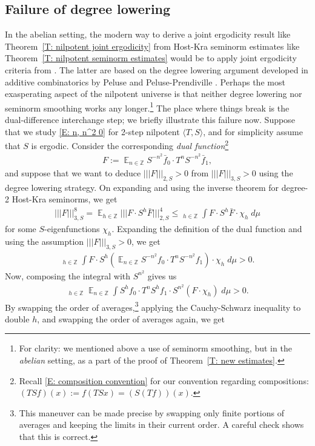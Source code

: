 \documentclass[11pt]{amsart}
\theoremstyle{definition}
\DeclareMathOperator*{\oE}{\overline{\mathbb{E}}}
\DeclareMathOperator*{\E}{\mathbb{E}}
\newcommand{\Z}{{\mathbb Z}}
\newcommand{\nnorm}[1]{\lvert\!|\!| #1|\!|\!\rvert}
\newcommand{\1}{{\mathbf{1}}}
\newcommand{\brac}[1]{\mathopen{}\left( #1 \mathclose{}\right)}
\begin{document}
\subsection{Failure of degree lowering}
In the abelian setting, the modern way to derive a joint ergodicity result like Theorem~\ref{T: nilpotent joint ergodicity} from Host-Kra seminorm estimates like Theorem~\ref{T: nilpotent seminorm estimates} would be to apply joint ergodicity criteria from \cite{BFM22, Fr21, FrKu22a}. The latter are based on the degree lowering argument developed in additive combinatorics by Peluse \cite{Pel19} and Peluse-Prendiville \cite{PP19}. Perhaps the most exasperating aspect of the nilpotent universe is that neither degree lowering nor seminorm smoothing works any longer.\footnote{For clarity: we mentioned above a use of seminorm smoothing, but in the \textit{abelian} setting, as a part of the proof of Theorem~\ref{T: new estimates}.} The place where things break is the dual-difference interchange step; we briefly illustrate this failure now. Suppose that we study \eqref{E: n, n^2 0} for 2-step nilpotent $\langle T, S\rangle$, and for simplicity assume that $S$ is ergodic. Consider the corresponding \textit{dual function}\footnote{Recall \eqref{E: composition convention} for our convention regarding compositions: $(TSf)(x) := f(TSx) = (S(Tf))(x).$}
\begin{align*}
    F := \E_{n\in\Z} S^{-n^2}\bar f_0\cdot T^n S^{-n^2}\bar f_1,
\end{align*}
and suppose that we want to deduce $\nnorm{F}_{2,S}>0$ from $\nnorm{F}_{3, S}>0$ using the degree lowering strategy. On expanding and using the inverse theorem for degree-2 Host-Kra seminorms, we get
\begin{align*}
    \nnorm{F}_{3,S}^8 = \E_{h\in\Z}\nnorm{F\cdot S^h\bar F}_{2,S}^4\leq \oE_{h\in\Z}\int F\cdot S^h\bar F\cdot \chi_h\; d\mu
\end{align*}
for some $S$-eigenfunctions $\chi_h$. Expanding the definition of the dual function and using the assumption $\nnorm{F}_{3, S}>0$, we get
\begin{align*}
    \oE_{h\in\Z}\int F\cdot S^h\brac{\E_{n\in\Z} S^{-n^2}f_0\cdot T^n S^{-n^2}f_1}\cdot \chi_h\; d\mu > 0.
\end{align*}
Now, composing the integral with $S^{n^2}$ gives us
\begin{align*}
    \oE_{h\in\Z} \E_{n\in\Z}\int S^hf_0\cdot T^n S^h f_1 \cdot S^{n^2}(F\cdot \chi_h)\; d\mu > 0.
\end{align*}
By swapping the order of averages,\footnote{This maneuver can be made precise by swapping only finite portions of averages and keeping the limits in their current order. A careful check shows that this is correct.} applying the Cauchy-Schwarz inequality to double $h$, and swapping the order of averages again, we get
\end{document}
